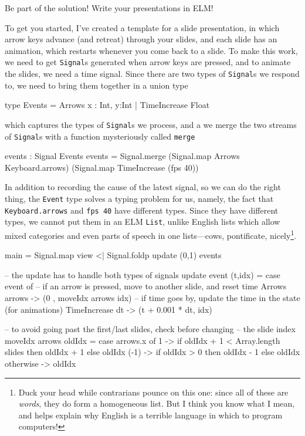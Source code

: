\documentclass[12pt]{amsbook}
\begin{document}
\medskip
Be part of the solution!  Write your presentations in ELM!

\medskip
To get you started, I've created a template for a slide presentation,
in which arrow keys advance (and retreat) through your slides,
and each slide has an animation, which restarts whenever you come back to a slide.
To make this work, we need to get \texttt{Signal}s generated when arrow keys are pressed,
and to animate the slides, we need a time signal.
Since there are two types of \texttt{Signal}s we respond to,
we need to bring them together in a union type
\begin{code}
type Events = Arrows {x : Int, y:Int} 
            | TimeIncrease Float
\end{code}
which captures the types of \texttt{Signal}s we process,
and a we merge the two streams of \texttt{Signal}s with a function mysteriously called \texttt{merge}
\begin{code}
events : Signal Events
events =
   Signal.merge
       (Signal.map Arrows       Keyboard.arrows)
       (Signal.map TimeIncrease (fps 40))
\end{code}
In addition to recording the cause of the latest signal, so we can do the right thing,
the \texttt{Event} type solves a typing problem for us, namely, 
the fact that \texttt{Keyboard.arrows} and \texttt{fps 40} have different types.
Since they have different types, we cannot put them in an ELM \texttt{List},
 unlike English lists which allow mixed categories and even parts of speech in one lists---cows, pontificate, nicely\footnote{Duck your head while contrarians pounce on this one: since all of these are \emph{words}, they do form a homogeneous list.  But I think you know what I mean, and helps explain why English is a terrible language in which to program computers!}.

main =
 Signal.map view <| Signal.foldp update (0,1) events

-- the update has to handle both types of signals
update event (t,idx)
 = case event of
     -- if an arrow is pressed, move to another slide, and reset time
     Arrows arrows   -> (0     , moveIdx arrows idx)
     -- if time goes by, update the time in the state (for animations)
     TimeIncrease dt -> (t + 0.001 * dt, idx)

-- to avoid going past the first/last slides, check before changing 
-- the slide index
moveIdx arrows oldIdx = case arrows.x of
                        1  -> if oldIdx + 1 < Array.length slides 
                              then oldIdx + 1
                              else oldIdx
                        (-1) -> if oldIdx > 0
                              then oldIdx - 1
                              else oldIdx
                        otherwise -> oldIdx
\end{document}
